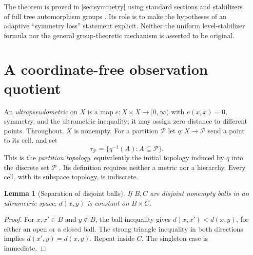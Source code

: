 \documentclass[11pt]{article}
\newtheorem{lemma}[theorem]{Lemma}
\theoremstyle{definition}
\theoremstyle{remark}
\newcommand{\PP}{\mathcal P}
\begin{document}
The theorem is proved in \cref{sec:symmetry} using standard sections and stabilizers of full tree automorphism groups \cite[Sections 1.2.2--1.2.3]{BranchGroups}. Its role is to make the hypotheses of an adaptive ``symmetry loss'' statement explicit. Neither the uniform level-stabilizer formula nor the general group-theoretic mechanism is asserted to be original.

\section{A coordinate-free observation quotient}\label{sec:quotient}
An \emph{ultrapseudometric} on $X$ is a map $e:X\times X\to[0,\infty)$ with $e(x,x)=0$, symmetry, and the ultrametric inequality; it may assign zero distance to different points. Throughout, $X$ is nonempty. For a partition $\PP$ let $q:X\to\PP$ send a point to its cell, and set
\[
 \tau_{\PP}=\{q^{-1}(A):A\subseteq\PP\}.
\]
This is the \emph{partition topology}, equivalently the initial topology induced by $q$ into the discrete set $\PP$ \cite[Definition 1]{Iyer2012}. Its definition requires neither a metric nor a hierarchy. Every cell, with its subspace topology, is indiscrete.

\begin{lemma}[Separation of disjoint balls]\label{lem:balls}
If $B,C$ are disjoint nonempty balls in an ultrametric space, $d(x,y)$ is constant on $B\times C$.
\end{lemma}
\begin{proof}
For $x,x'\in B$ and $y\notin B$, the ball inequality gives $d(x,x')<d(x,y)$, for either an open or a closed ball. The strong triangle inequality in both directions implies $d(x',y)=d(x,y)$. Repeat inside $C$. The singleton case is immediate.
\end{proof}
\end{document}
